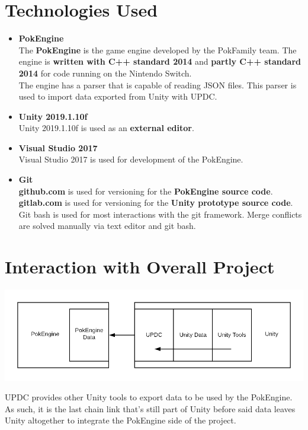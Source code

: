\documentclass[12pt,a4paper]{article}
\begin{document}
\section{Technologies Used}
\begin{itemize}
	\item \textbf{PokEngine}\\
		The \textbf{PokEngine} is the game engine developed by the PokFamily team. The engine is \textbf{written with C++ standard 2014} and \textbf{partly C++ standard 2014} for code running on the Nintendo Switch.\\
The engine has a parser that is capable of reading JSON files. This parser is used to import data exported from Unity with UPDC.

	\item \textbf{Unity 2019.1.10f}\\
		Unity 2019.1.10f is used as an \textbf{external editor}.
	
	\item \textbf{Visual Studio 2017}\\
		Visual Studio 2017 is used for development of the PokEngine.
	
	\item \textbf{Git}\\
		\textbf{github.com} is used for versioning for the \textbf{PokEngine source code}. \textbf{gitlab.com} is used for versioning for the \textbf{Unity prototype source code}. Git bash is used for most interactions with the git framework. Merge conflicts are solved manually via text editor and git bash.
		
\end{itemize}

\section{Interaction with Overall Project}
\begin{center}
\includegraphics[scale=0.5]{UPDCLocation}
\end{center}
UPDC provides other Unity tools to export data to be used by the PokEngine. As such, it is the last chain link that's still part of Unity before said data leaves Unity altogether to integrate the PokEngine side of the project.
\end{document}
